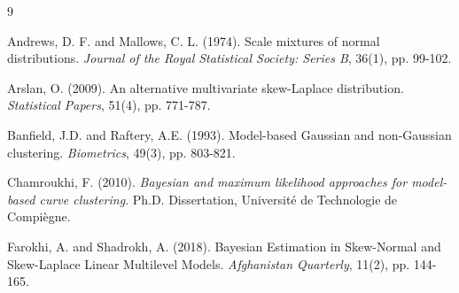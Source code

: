 \documentclass[twoside]{article}
\begin{document}
\begin{thebibliography}{9}

Andrews, D. F. and Mallows, C. L. (1974). Scale mixtures of normal distributions. \textit{Journal of the Royal Statistical Society: Series B}, 36(1), pp. 99-102.

Arslan, O. (2009). An alternative multivariate skew-Laplace distribution. \textit{Statistical Papers}, 51(4), pp. 771-787.



Banfield, J.D. and Raftery, A.E. (1993). Model-based Gaussian and non-Gaussian clustering. \textit{Biometrics}, 49(3), pp. 803-821.


Chamroukhi, F. (2010). \textit{Bayesian and maximum likelihood approaches for model-based curve clustering}. Ph.D. Dissertation, Université de Technologie de Compiègne.




Farokhi, A. and Shadrokh, A. (2018). Bayesian Estimation in Skew-Normal and Skew-Laplace Linear Multilevel Models. \textit{Afghanistan Quarterly}, 11(2), pp. 144-165.


\end{thebibliography}
\end{document}

